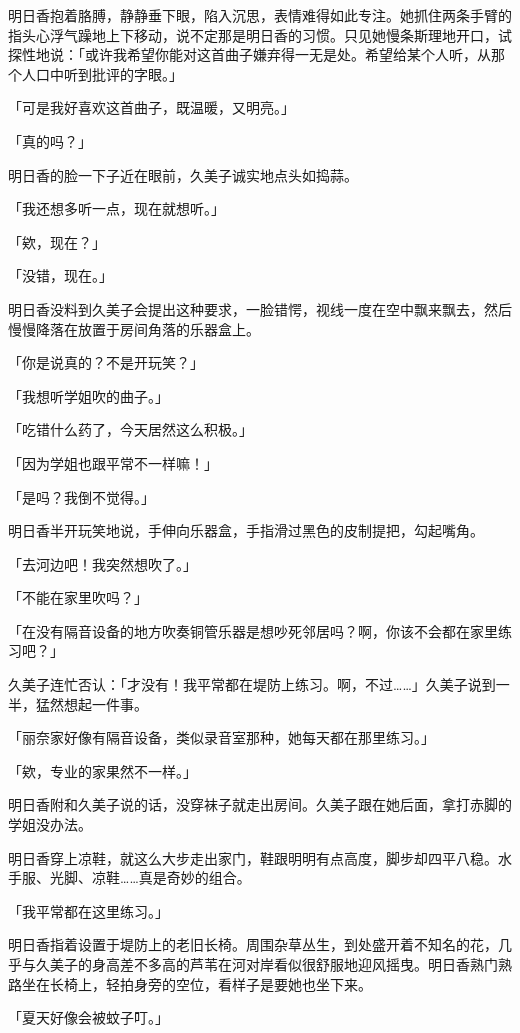 \documentclass[UTF8]{ctexart}
\begin{document}
    明日香抱着胳膊，静静垂下眼，陷入沉思，表情难得如此专注。她抓住两条手臂的指头心浮气躁地上下移动，说不定那是明日香的习惯。只见她慢条斯理地开口，试探性地说：「或许我希望你能对这首曲子嫌弃得一无是处。希望给某个人听，从那个人口中听到批评的字眼。」 

    「可是我好喜欢这首曲子，既温暖，又明亮。」 

    「真的吗？」 

    明日香的脸一下子近在眼前，久美子诚实地点头如捣蒜。 

    「我还想多听一点，现在就想听。」 

    「欸，现在？」 

    「没错，现在。」 

    明日香没料到久美子会提出这种要求，一脸错愕，视线一度在空中飘来飘去，然后慢慢降落在放置于房间角落的乐器盒上。 

    「你是说真的？不是开玩笑？」 

    「我想听学姐吹的曲子。」 

    「吃错什么药了，今天居然这么积极。」 

    「因为学姐也跟平常不一样嘛！」 

    「是吗？我倒不觉得。」 

    明日香半开玩笑地说，手伸向乐器盒，手指滑过黑色的皮制提把，勾起嘴角。 

    「去河边吧！我突然想吹了。」 

    「不能在家里吹吗？」 

    「在没有隔音设备的地方吹奏铜管乐器是想吵死邻居吗？啊，你该不会都在家里练习吧？」 

    久美子连忙否认：「才没有！我平常都在堤防上练习。啊，不过……」久美子说到一半，猛然想起一件事。 

    「丽奈家好像有隔音设备，类似录音室那种，她每天都在那里练习。」 

    「欸，专业的家果然不一样。」 

    明日香附和久美子说的话，没穿袜子就走出房间。久美子跟在她后面，拿打赤脚的学姐没办法。 

    明日香穿上凉鞋，就这么大步走出家门，鞋跟明明有点高度，脚步却四平八稳。水手服、光脚、凉鞋……真是奇妙的组合。 

    「我平常都在这里练习。」 

    明日香指着设置于堤防上的老旧长椅。周围杂草丛生，到处盛开着不知名的花，几乎与久美子的身高差不多高的芦苇在河对岸看似很舒服地迎风摇曳。明日香熟门熟路坐在长椅上，轻拍身旁的空位，看样子是要她也坐下来。 

    「夏天好像会被蚊子叮。」 
\end{document}
